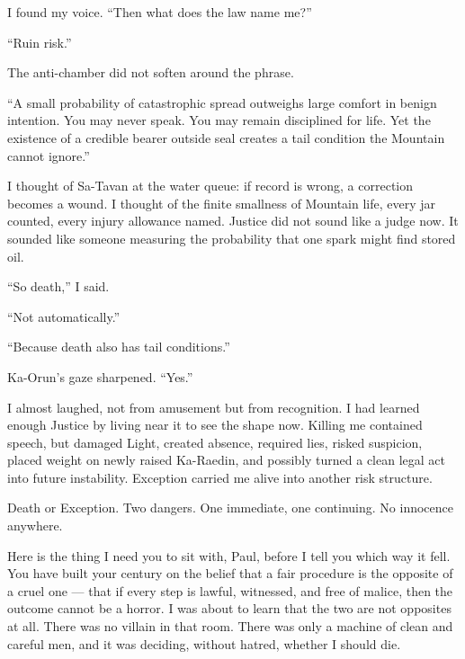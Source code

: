 I found my voice. ``Then what does the law name me?''\par

``Ruin risk.''\par

The anti-chamber did not soften around the phrase.\par

``A small probability of catastrophic spread outweighs large comfort in benign intention. You may never speak. You may remain disciplined for life. Yet the existence of a credible bearer outside seal creates a tail condition the Mountain cannot ignore.''\par

I thought of Sa-Tavan at the water queue: if record is wrong, a correction becomes a wound. I thought of the finite smallness of Mountain life, every jar counted, every injury allowance named. Justice did not sound like a judge now. It sounded like someone measuring the probability that one spark might find stored oil.\par

``So death,'' I said.\par

``Not automatically.''\par

``Because death also has tail conditions.''\par

Ka-Orun's gaze sharpened. ``Yes.''\par

I almost laughed, not from amusement but from recognition. I had learned enough Justice by living near it to see the shape now. Killing me contained speech, but damaged Light, created absence, required lies, risked suspicion, placed weight on newly raised Ka-Raedin, and possibly turned a clean legal act into future instability. Exception carried me alive into another risk structure.\par

Death or Exception. Two dangers. One immediate, one continuing. No innocence anywhere.\par

Here is the thing I need you to sit with, Paul, before I tell you which way it fell. You have built your century on the belief that a fair procedure is the opposite of a cruel one --- that if every step is lawful, witnessed, and free of malice, then the outcome cannot be a horror. I was about to learn that the two are not opposites at all. There was no villain in that room. There was only a machine of clean and careful men, and it was deciding, without hatred, whether I should die.\par

